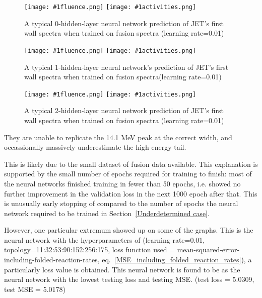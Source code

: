 \documentclass[a4paper, 12pt]{article}
\newcommand{\fluenceandactivities}[1]{
\texttt{[image: \#1fluence.png]}
\texttt{[image: \#1activities.png]}
}
\begin{document}
\begin{figure}[H]
\centering
\fluenceandactivities{/home/ocean/Documents/GitHubDir/unfolding/unfolding/unfoldingsuite/neuralnetwork/realoutputEarlyStopping/SelectedNNreplicated/fusion-fusion-final/0927_0215_0_layerfinal_inv_0_test_001_}
\caption{A typical 0-hidden-layer neural network prediction of JET's first wall spectra when trained on fusion spectra (learning rate=0.01)}
\end{figure}

\begin{figure}[H]
\centering
\fluenceandactivities{/home/ocean/Documents/GitHubDir/unfolding/unfolding/unfoldingsuite/neuralnetwork/realoutputEarlyStopping/SelectedNNreplicated/fusion-fusion-final/0927_0217_1_layerfinal_inv_1_test_001_}
\caption{A typical 1-hidden-layer neural network's prediction of JET's first wall spectra when trained on fusion spectra(learning rate=0.01)}
\end{figure}

\begin{figure}
\centering
\fluenceandactivities{/home/ocean/Documents/GitHubDir/unfolding/unfolding/unfoldingsuite/neuralnetwork/realoutputEarlyStopping/SelectedNNreplicated/fusion-fusion/0927_0219_2_layerfinal_inv_2_test_001_}
\caption{A typical 2-hidden-layer neural network prediction of JET's first wall spectra when trained on fusion spectra (learning rate=0.01)}\label{3Layerfusion-fusionJET-FW}
\end{figure}

They are unable to replicate the 14.1 MeV peak at the correct width, and occassionally massively underestimate the high energy tail.

This is likely due to the small dataset of fusion data available. This explanation is supported by the small number of epochs required for training to finish: most of the neural networks finished training in fewer than 50 epochs, i.e. showed no further improvement in the validation loss in the next 1000 epoch after that. This is unusually early stopping of compared to the number of epochs the neural network required to be trained in Section~\ref{Underdetermined case}.

However, one particular extremum showed up on some of the graphs. This is the neural network with the hyperparameters of (learning rate=0.01, topology=11:32:53:90:152:256:175, loss function used = mean-squared-error-including-folded-reaction-rates, eq.~\ref{MSE_including_folded_reaction_rates}), a particularly loss value is obtained. This neural network is found to be as the neural network with the lowest testing loss and testing MSE. (test loss = 5.0309, test MSE = 5.0178)
\end{document}
